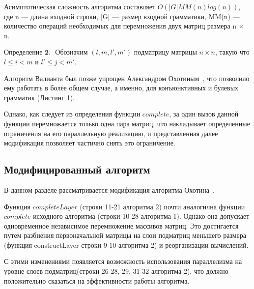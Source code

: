 \documentclass[14pt]{matmex-diploma}
\begin{document}
Асимптотическая сложность алгоритма составляет \linebreak
    $O(|G|MM(n)log(n))$, где n --- длина входной строки, |G| --- размер входной грамматики, MM(n) --- количество операций необходимых для перемножения двух матриц размера n $\times$ n. 

$\textbf{Определение 2. }$
    Обозначим $(l, m, l', m')$ подматрицу матрицы $n \times n$, такую что $l \leq i < m$ и $l' \leq j < m'$.
    

Алгоритм Валианта был позже упрощен Александром Охотиным~\cite{okh}, что позволило ему работать в более общем случае, а именно, для конъюнктивных и булевых грамматик (Листинг 1).

Однако, как следует из определения функции $\textit{complete}$, за один вызов данной функции перемножается только одна пара матриц, что накладывает определенные ограничения на его параллельную реализацию, и представленная далее модификация позволяет частично снять это ограничение.


\subsection {Модифицированный алгоритм}

В данном разделе рассматривается модификация алгоритма Охотина~\cite{alg}. 

Функция $\textit{completeLayer}$ (строки 11-21 алгоритма 2) почти аналогична функции $\textit{complete}$ исходного алгоритма (строки 10-28 алгоритма 1). Однако она допускает одновременное независимое перемножение массивов матриц. Это достигается путем разбиения первоначальной матрицы на слои подматриц меньшего размера (функция constructLayer строки 9-10 алгоритма 2) и реорганизации вычислений. 

С этими изменениями появляется возможность использования параллелизма на уровне слоев подматриц(строки 26-28, 29, 31-32 алгоритма 2), что должно положительно сказаться на эффективности работы алгоритма.\\
\end{document}
